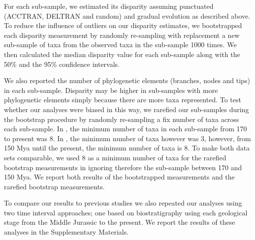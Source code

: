 \documentclass[12pt,letterpaper]{article}
\begin{document}
For each sub-sample, we estimated its disparity assuming punctuated (ACCTRAN, DELTRAN and random) and gradual evolution as described above.
To reduce the influence of outliers on our disparity estimates, we bootstrapped each disparity measurement by randomly re-sampling with replacement a new sub-sample of taxa from the observed taxa in the sub-sample 1000 times.
We then calculated the median disparity value for each sub-sample along with the 50\% and the 95\% confidence intervals.

We also reported the number of phylogenetic elements (branches, nodes and tips) in each sub-sample.
Disparity may be higher in sub-samples with more phylogenetic elements simply because there are more taxa represented.
To test whether our analyses were biased in this way, we rarefied our sub-samples during the bootstrap procedure by randomly re-sampling a fix number of taxa across each sub-sample.
In \cite{Slater2012MEE}, the minimum number of taxa in each sub-sample from 170 to present was 8.
In \cite{beckancient2014}, the minimum number of taxa however was 3, however, from 150 Mya until the present, the minimum number of taxa is 8.
To make both data sets comparable, we used 8 as a minimum number of taxa for the rarefied bootstrap measurements in \cite{beckancient2014} ignoring therefore the sub-sample between 170 and 150 Mya.
We report both results of the bootstrapped measurements and the rarefied bootstrap measurements.

To compare our results to previous studies we also repeated our analyses using two time interval approaches; one based on biostratigraphy \citep[e.g.][]{cisneros2010,prentice2011,Hughes20082013,bentonmodels2014} using each geological stage from the Middle Jurassic to the present.
We report the results of these analyses in the Supplementary Materials. %
\end{document}
